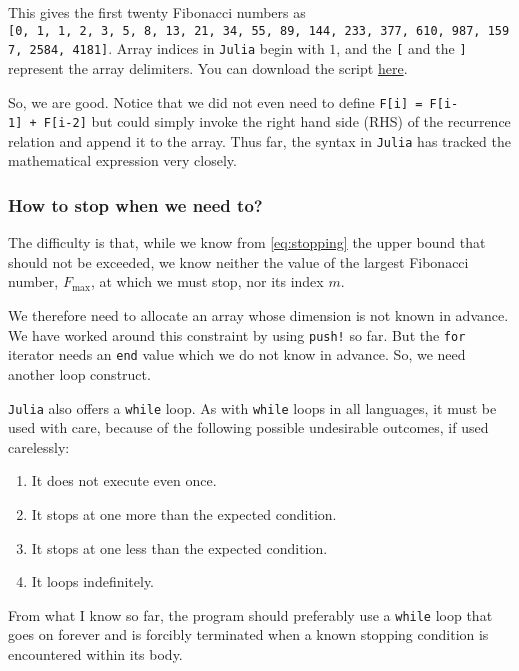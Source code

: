 \documentclass[
  a4paper,
]{article}
\providecommand{\tightlist}{%
  \setlength{\itemsep}{0pt}\setlength{\parskip}{0pt}}
\begin{document}
This gives the first twenty Fibonacci numbers as
\texttt{{[}0,\ 1,\ 1,\ 2,\ 3,\ 5,\ 8,\ 13,\ 21,\ 34,\ 55,\ 89,\ 144,\ 233,\ 377,\ 610,\ 987,\ 1597,\ 2584,\ 4181{]}}.
Array indices in \texttt{Julia} begin with \(1\), and the \texttt{{[}}
and the \texttt{{]}} represent the array delimiters. You can download
the script \href{auxiliary/\%7Dfirst-twenty.jl}{here}.

So, we are good. Notice that we did not even need to define
\texttt{F{[}i{]}\ =\ F{[}i-1{]}\ +\ F{[}i-2{]}} but could simply invoke
the right hand side (RHS) of the recurrence relation and append it to
the array. Thus far, the syntax in \texttt{Julia} has tracked the
mathematical expression very closely.

\hypertarget{how-to-stop-when-we-need-to}{%
\subsubsection{How to stop when we need
to?}\label{how-to-stop-when-we-need-to}}

The difficulty is that, while we know from \cref{eq:stopping} the upper
bound that should not be exceeded, we know neither the value of the
largest Fibonacci number, \(F_{\max}\), at which we must stop, nor its
index \(m\).

We therefore need to allocate an array whose dimension is not known in
advance. We have worked around this constraint by using \texttt{push!}
so far. But the \texttt{for} iterator needs an \texttt{end} value which
we do not know in advance. So, we need another loop construct.

\texttt{Julia} also offers a \texttt{while} loop. As with \texttt{while}
loops in all languages, it must be used with care, because of the
following possible undesirable outcomes, if used carelessly:

\begin{enumerate}
\def\labelenumi{\alph{enumi}.}
\tightlist
\item
  It does not execute even once.
\item
  It stops at one more than the expected condition.
\item
  It stops at one less than the expected condition.
\item
  It loops indefinitely.
\end{enumerate}

From what I know so far, the program should preferably use a
\texttt{while} loop that goes on forever and is forcibly terminated when
a known stopping condition is encountered within its body.
\end{document}
